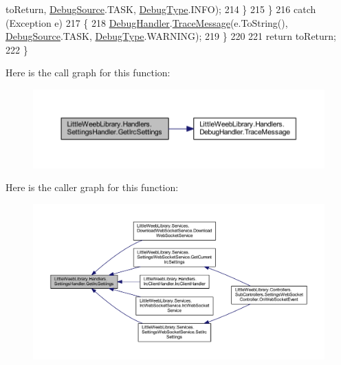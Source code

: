 \begin{DoxyCode}
      toReturn, \mbox{\hyperlink{namespace_little_weeb_library_1_1_handlers_a2a6ca0775121c9c503d58aa254d292be}{DebugSource}}.TASK, \mbox{\hyperlink{namespace_little_weeb_library_1_1_handlers_ab66019ed40462876ec4e61bb3ccb0a62}{DebugType}}.INFO);
214                 \}
215             \}
216             \textcolor{keywordflow}{catch} (Exception e)
217             \{
218                 \mbox{\hyperlink{class_little_weeb_library_1_1_handlers_1_1_settings_handler_a80da61f3a3fcbb5f9ac6057591a98acf}{DebugHandler}}.\mbox{\hyperlink{interface_little_weeb_library_1_1_handlers_1_1_i_debug_handler_a2e405bc3492e683cd3702fae125221bc}{TraceMessage}}(e.ToString(), 
      \mbox{\hyperlink{namespace_little_weeb_library_1_1_handlers_a2a6ca0775121c9c503d58aa254d292be}{DebugSource}}.TASK, \mbox{\hyperlink{namespace_little_weeb_library_1_1_handlers_ab66019ed40462876ec4e61bb3ccb0a62}{DebugType}}.WARNING);
219             \}
220 
221             \textcolor{keywordflow}{return} toReturn;
222         \}
\end{DoxyCode}
Here is the call graph for this function\+:\nopagebreak
\begin{figure}[H]
\begin{center}
\leavevmode
\includegraphics[width=350pt]{class_little_weeb_library_1_1_handlers_1_1_settings_handler_a22195b5d1df129295e0e30298611bdba_cgraph}
\end{center}
\end{figure}
Here is the caller graph for this function\+:\nopagebreak
\begin{figure}[H]
\begin{center}
\leavevmode
\includegraphics[width=350pt]{class_little_weeb_library_1_1_handlers_1_1_settings_handler_a22195b5d1df129295e0e30298611bdba_icgraph}
\end{center}
\end{figure}


